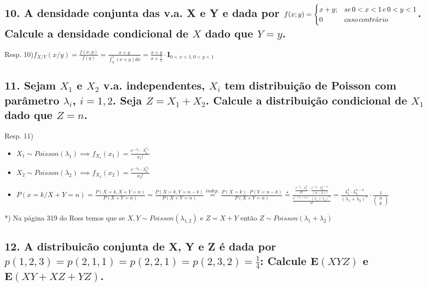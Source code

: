 \documentclass[english]{article}
\begin{document}
\subsection*{\textmd{10. A densidade conjunta das v.a. X e Y e dada por $f(x;y)=\protect\begin{cases}
x+y; & se\,0<x<1\, e\,0<y<1\protect\\
0 & caso\, contr\acute{a}rio
\protect\end{cases}$. Calcule a densidade condicional de $X$ dado que $Y=y$. }}

Resp. 10)$f_{X/Y}(x/y)=\frac{f(x,y)}{f(y)}=\frac{x+y}{\int_{0}^{1}(x+y)dx}=\frac{x+y}{x+\frac{1}{2}}\cdot\mathbf{I}_{0<x<1,0<y<1}$


\subsection*{\textmd{11. Sejam $X_{1}$ e $X_{2}$ v.a. independentes, $X_{i}$
tem distribuição de Poisson com parâmetro $\lambda_{i}$, $i=1,2$.
Seja $Z=X_{1}+X_{2}$. Calcule a distribuição condicional de $X_{1}$
dado que $Z=n$. }}

Resp. 11)
\begin{itemize}
\item $X_{1}\sim Poisson(\lambda_{1})\implies f_{X_{1}}(x_{1})=\frac{e^{-\lambda_{1}}\cdot\lambda_{1}^{x_{1}}}{x_{1}!}$
\item $X_{2}\sim Poisson(\lambda_{2})\implies f_{X_{2}}(x_{2})=\frac{e^{-\lambda_{2}}\cdot\lambda_{2}^{x_{2}}}{x_{2}!}$
\item $P(x=k/X+Y=n)=\frac{P(X=k,X+Y=n)}{P(X+Y=n)}=\frac{P(X=k,Y=n-k)}{P(X+Y=n)}\overset{indep.}{=}\frac{P(X=k)\cdot P(Y=n-k)}{P(X+Y=n)}\overset{*}{=}\frac{\frac{e^{-\lambda_{1}}\cdot\lambda_{1}^{k}}{k!}\cdot\frac{e^{-\lambda_{2}}\cdot\lambda_{2}^{n-k}}{(n-k)!}}{\frac{e^{-(\lambda_{1}+\lambda_{2})}\cdot(\lambda_{1}+\lambda_{2})^{n}}{n!}}=\frac{\lambda_{1}^{k}\cdot\lambda_{2}^{n-k}}{(\lambda_{1}+\lambda_{2})^{n}}\cdot\frac{1}{\left(\begin{array}{c}
n\\
k
\end{array}\right)}$
\end{itemize}
{*}) Na página 319 do Ross temos que se $X,Y\sim Poisson(\lambda_{1,2})$
e $Z=X+Y$ então $Z\sim Poisson(\lambda_{1}+\lambda_{2})$


\subsection*{\textmd{12. A distribuicão conjunta de X, Y e Z é dada por $p(1,2,3)=p(2,1,1)=p(2,2,1)=p(2,3,2)=\frac{1}{4}$:
Calcule $\mathbf{E}(XYZ)$ e $\mathbf{E}(XY+XZ+YZ)$. }}
\end{document}
